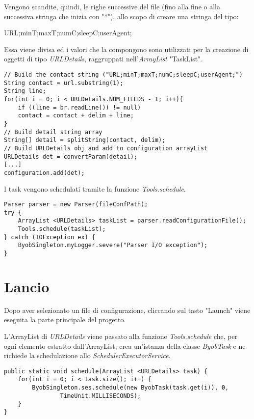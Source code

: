 Vengono scandite, quindi, le righe successive del file (fino alla fine o alla successiva stringa che inizia con "*"), allo scopo di creare una stringa del tipo:

\vspace{0.5cm}
\begin{normalsize}
	URL;minT;maxT;numC;sleepC;userAgent;
\end{normalsize}

\vspace{0.5cm}
Essa viene divisa ed i valori che la compongono sono utilizzati per la creazione di oggetti di tipo \textit{URLDetails}, raggruppati nell'\textit{ArrayList} "TaskList".

\vspace{0.5cm}
\begin{lstlisting}
// Build the contact string ("URL;minT;maxT;numC;sleepC;userAgent;")
String contact = url.substring(1);
String line;
for(int i = 0; i < URLDetails.NUM_FIELDS - 1; i++){
	if ((line = br.readLine()) != null)
	contact = contact + delim + line;
}
// Build detail string array
String[] detail = splitString(contact, delim);
// Build URLDetails obj and add to configuration arrayList
URLDetails det = convertParam(detail);
[...]
configuration.add(det);
\end{lstlisting}


I task vengono schedulati tramite la funzione \textit{Tools.schedule}.

\vspace{0.5cm}
\begin{lstlisting}
Parser parser = new Parser(fileConfPath);
try {
	ArrayList <URLDetails> taskList = parser.readConfigurationFile();
	Tools.schedule(taskList);
} catch (IOException ex) {
	ByobSingleton.myLogger.severe("Parser I/O exception");
}
\end{lstlisting}


\section{Lancio}
Dopo aver selezionato un file di configurazione, cliccando sul tasto "Launch" viene eseguita la parte principale del progetto.

L'ArrayList di \textit{URLDetails} viene passato alla funzione \textit{Tools.schedule} che, per ogni elemento estratto dall'ArrayList, crea un'istanza della classe \textit{ByobTask} e ne richiede la schedulazione allo \textit{SchedulerExecutorService}.

\vspace{0.5cm}
\begin{lstlisting}
public static void schedule(ArrayList <URLDetails> task) {
    for(int i = 0; i < task.size(); i++) {
	    ByobSingleton.ses.schedule(new ByobTask(task.get(i)), 0,
			    TimeUnit.MILLISECONDS);
    }
}
\end{lstlisting}


